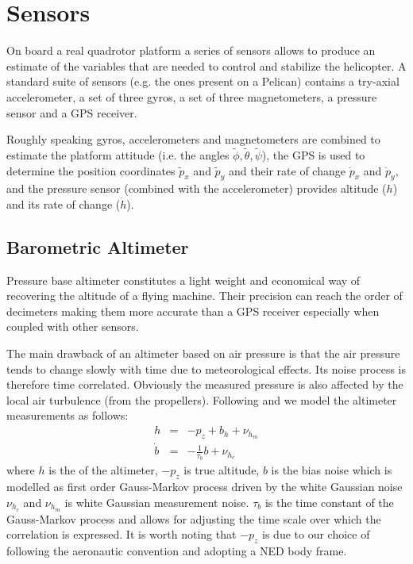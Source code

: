 \documentclass[a4paper,11pt]{report}
\begin{document}
\section{Sensors}

On board a real quadrotor platform a series of sensors allows to produce an estimate of the variables that are needed to control and stabilize the helicopter.
A standard suite of sensors (e.g. the ones present on a Pelican) contains a try-axial accelerometer, a set of three gyros, a set of three magnetometers, a pressure sensor and a GPS receiver.

Roughly speaking gyros, accelerometers and magnetometers are combined to estimate the platform attitude (i.e. the angles $\tilde{\phi},\tilde{\theta},\tilde{\psi}$), the GPS is used to determine the position coordinates $\tilde{p}_x$ and $\tilde{p}_y$ and their rate of change $\dot{p}_x$ and $\dot{p}_y$, and the pressure sensor (combined with the accelerometer) provides altitude ($h$) 
and its rate of change ($\dot{h}$).


\subsection{Barometric Altimeter}

Pressure base altimeter constitutes a light weight and economical way of recovering the altitude of a flying machine. Their precision can reach the order of decimeters making them more accurate than a GPS receiver especially when coupled with other sensors. 

The main drawback of an altimeter based on air pressure is that the air pressure tends to change slowly with time due to meteorological effects.  Its noise process is therefore time correlated. Obviously the measured pressure is also affected by the local air turbulence (from the propellers).
Following \cite{stanley1991akalman} and \cite{seo2004position} we model the altimeter measurements as follows:
\begin{eqnarray}
      h&=&-p_z+b_h+\nu_{h_m}  \\
       \dot{b}&=&-\frac{1}{\tau_b}b+\nu_{h_c}
\end{eqnarray}
where $h$ is the of the altimeter, $-p_z$ is true altitude, $b$ is the bias noise which is modelled as first order Gauss-Markov process driven by the white Gaussian noise $\nu_{h_c}$ and $\nu_{h_m}$ is white Gaussian measurement noise. $\tau_b$ is the time constant of the Gauss-Markov process and allows for adjusting the time scale over which the correlation is expressed.
It is worth noting that $-p_z$ is due to our choice of following the aeronautic convention and adopting a NED body frame.
\end{document}
